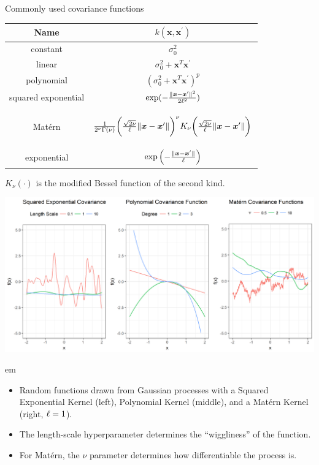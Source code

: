\begin{vbframe}{Commonly used covariance functions}

\begin{table}[]
\centering
\begin{tabular}{|c|c|}
\hline
Name & $k(\bm{x}, \bm{x}^\prime)$\\
\hline
constant & $\sigma_0^2$ \\ [1em]
linear & $\sigma_0^2 + \bm{x}^T\bm{x}^\prime$ \\ [1em]
polynomial & $(\sigma_0^2 + \bm{x}^T\bm{x}^\prime)^p$ \\ [1em]
squared exponential & $\exp(- \frac{\|\bm{x} - \bm{x}^\prime\|^2}{2\ell^2})$ \\ [1em]
Matérn & \begin{footnotesize} $\frac{1}{2^\nu \Gamma(\nu)}\biggl(\frac{\sqrt{2 \nu}}{\ell}\|\bm{x} - \bm{x}^\prime\|\biggr)^{\nu} K_\nu\biggl(\frac{\sqrt{2 \nu}}{\ell}\|\bm{x} - \bm{x}^\prime\|\biggr)$\end{footnotesize}  \\ [1em]
exponential & $\exp\left(- \frac{\|\bm{x} - \bm{x}^\prime\|}{\ell}\right)$ \\ [1em]
\hline
\end{tabular}
\end{table}
\begin{footnotesize}
$K_\nu(\cdot)$ is the modified Bessel function of the second kind.
\end{footnotesize}


\begin{center}

\includegraphics{figure_man/covariance.png}
\end{center}
 em
\begin{footnotesize}
\begin{itemize}
\item Random functions drawn from Gaussian processes with a Squared Exponential Kernel (left), Polynomial Kernel (middle), and a Matérn Kernel (right, $\ell = 1$). 
\item The length-scale hyperparameter determines the ``wiggliness'' of the function.
\item For Matérn, the $\nu$ parameter determines how differentiable the process is.
\end{itemize}
\end{footnotesize}
\end{vbframe}

